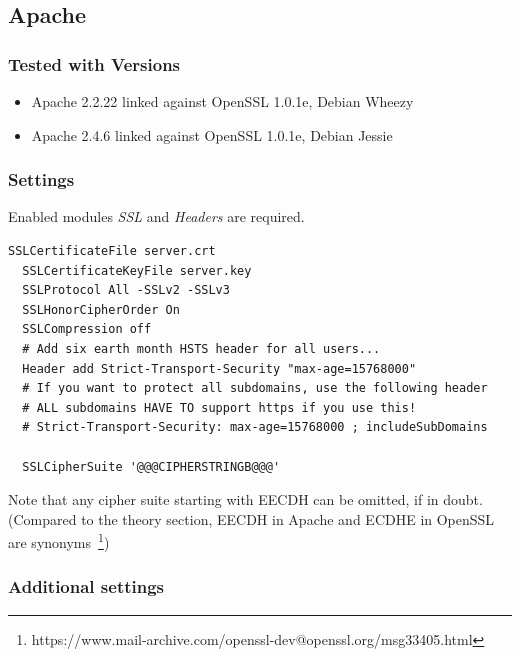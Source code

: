 
\subsection{Apache}

\subsubsection{Tested with Versions} 
\begin{itemize}
\item Apache 2.2.22 linked against OpenSSL 1.0.1e, Debian Wheezy
\item Apache 2.4.6 linked against OpenSSL 1.0.1e, Debian Jessie
\end{itemize}


\subsubsection{Settings} 

Enabled modules \emph{SSL} and \emph{Headers} are required.

\begin{lstlisting}[breaklines]
  SSLCertificateFile server.crt
  SSLCertificateKeyFile server.key
  SSLProtocol All -SSLv2 -SSLv3 
  SSLHonorCipherOrder On
  SSLCompression off
  # Add six earth month HSTS header for all users...
  Header add Strict-Transport-Security "max-age=15768000"
  # If you want to protect all subdomains, use the following header
  # ALL subdomains HAVE TO support https if you use this!
  # Strict-Transport-Security: max-age=15768000 ; includeSubDomains

  SSLCipherSuite '@@@CIPHERSTRINGB@@@'

\end{lstlisting}

Note that any cipher suite starting with EECDH can be omitted, if in doubt.
(Compared to the theory section, EECDH in Apache and ECDHE in OpenSSL are
synonyms~\footnote{https://www.mail-archive.com/openssl-dev@openssl.org/msg33405.html})

\subsubsection{Additional settings}

